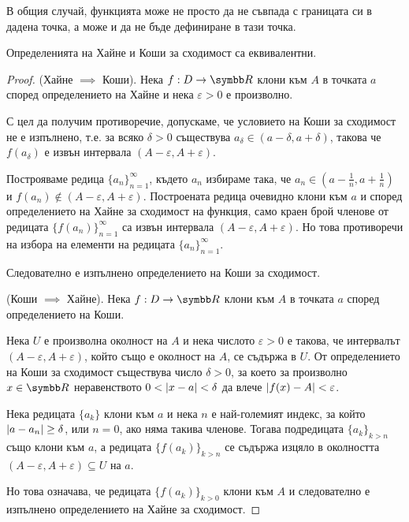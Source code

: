 \documentclass[numbers=endperiod, bibliography=totocnumbered]{scrartcl}
\begin{document}
\begin{remark}
  В общия случай, функцията може не просто да не съвпада с границата си в дадена точка, а може и да не бъде дефиниране в тази точка.
\end{remark}

\begin{theorem}\label{thm:heine_iff_cauchy}
  Определенията на Хайне и Коши за сходимост са еквивалентни.
\end{theorem}
\begin{proof}
  (Хайне \( \implies \) Коши). Нека \( f: D \to \R \) клони към \( A \) в точката \( a \) според определението на Хайне и нека \( \varepsilon > 0 \) е произволно.

  С цел да получим противоречие, допускаме, че условието на Коши за сходимост не е изпълнено, т.е. за всяко \( \delta > 0 \) съществува \( a_\delta \in (a - \delta, a + \delta) \), такова че \( f(a_\delta) \) е извън интервала \( (A - \varepsilon, A + \varepsilon) \).

  Построяваме редица \( \{ a_n \}_{n=1}^\infty \), където \( a_n \) избираме така, че \( a_n \in \left(a - \frac 1 n, a + \frac 1 n \right) \) и \( f(a_n) \not\in (A - \varepsilon, A + \varepsilon) \). Построената редица очевидно клони към \( a \) и според определението на Хайне за сходимост на функция, само краен брой членове от редицата \( \{ f(a_n) \}_{n=1}^\infty \) са извън интервала \( (A - \varepsilon, A + \varepsilon) \). Но това противоречи на избора на елементи на редицата \( \{ a_n \}_{n=1}^\infty \).

  Следователно е изпълнено определението на Коши за сходимост.

  (Коши \( \implies \) Хайне). Нека \( f: D \to \R \) клони към \( A \) в точката \( a \) според определението на Коши.

  Нека \( U \) е произволна околност на \( A \) и нека числото \( \varepsilon > 0 \) е такова, че интервалът \( (A - \varepsilon, A + \varepsilon) \), който също е околност на \( A \), се съдържа в \( U \). От определението на Коши за сходимост съществува число \( \delta > 0 \), за което за произволно \( x \in \R \) неравенството \( 0 < \left\vert x - a \right\vert < \delta \) да влече \( \left\vert f(x) - A \right\vert < \varepsilon \).

  Нека редицата \( \{ a_k \} \) клони към \( a \) и нека \( n \) е най-големият индекс, за който \( \left\vert a - a_n \right\vert \geq \delta \), или \( n = 0 \), ако няма такива членове. Тогава подредицата \( {\{ a_k \}}_{k>n} \) също клони към \( a \), а редицата \( {\{ f(a_k) \}}_{k>n} \) се съдържа изцяло в околността \( (A - \varepsilon, A + \varepsilon) \subseteq U \) на \( a \).

  Но това означава, че редицата \( {\{ f(a_k) \}}_{k>0} \) клони към \( A \) и следователно е изпълнено определението на Хайне за сходимост.
\end{proof}
\end{document}
